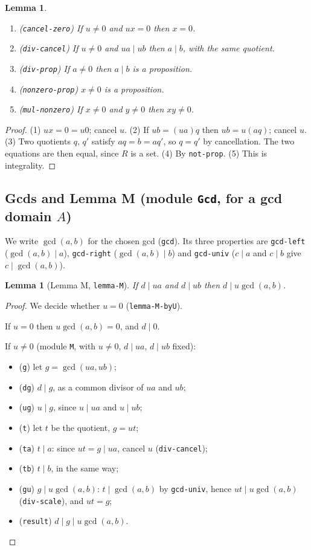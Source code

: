 \documentclass[11pt]{amsart}
\newtheorem{lemma}[theorem]{Lemma}
\theoremstyle{definition}
\theoremstyle{remark}
\newcommand{\nm}[1]{\textup{\texttt{#1}}}
\newcommand{\gcdd}{\operatorname{gcd}}
\begin{document}
\begin{lemma}
\begin{enumerate}
\item (\nm{cancel-zero}) If $u\neq0$ and $ux=0$ then $x=0$.
\item (\nm{div-cancel}) If $u\neq0$ and $ua\mid ub$ then $a\mid b$, with
  the same quotient.
\item (\nm{div-prop}) If $a\neq0$ then $a\mid b$ is a proposition.
\item (\nm{nonzero-prop}) $x\neq0$ is a proposition.
\item (\nm{mul-nonzero}) If $x\neq0$ and $y\neq0$ then $xy\neq0$.
\end{enumerate}
\end{lemma}
\begin{proof}
(1) $ux = 0 = u0$; cancel $u$.
(2) If $ub = (ua)q$ then $ub = u(aq)$; cancel $u$.
(3) Two quotients $q$, $q'$ satisfy $aq = b = aq'$, so $q=q'$ by
cancellation. The two equations are then equal, since $R$ is a set.
(4) By \nm{not-prop}. (5) This is integrality.
\end{proof}

\subsection{Gcds and Lemma M (module \nm{Gcd}, for a gcd domain $A$)}

We write $\gcdd(a,b)$ for the chosen gcd (\nm{gcd}). Its three properties
are \nm{gcd-left} ($\gcdd(a,b)\mid a$), \nm{gcd-right}
($\gcdd(a,b)\mid b$) and \nm{gcd-univ} ($c\mid a$ and $c\mid b$ give
$c\mid\gcdd(a,b)$).

\begin{lemma}[Lemma M, \nm{lemma-M}]\label{lem:M}
If $d\mid ua$ and $d\mid ub$ then $d\mid u\gcdd(a,b)$.
\end{lemma}
\begin{proof}
We decide whether $u=0$ (\nm{lemma-M-byU}).

If $u = 0$ then $u\gcdd(a,b) = 0$, and $d\mid 0$.

If $u\neq0$ (module \nm{M}, with $u\neq0$, $d\mid ua$, $d\mid ub$ fixed):
\begin{itemize}
\item (\nm{g}) let $g = \gcdd(ua,ub)$;
\item (\nm{dg}) $d\mid g$, as a common divisor of $ua$ and $ub$;
\item (\nm{ug}) $u\mid g$, since $u\mid ua$ and $u\mid ub$;
\item (\nm{t}) let $t$ be the quotient, $g = ut$;
\item (\nm{ta}) $t\mid a$: since $ut = g\mid ua$, cancel $u$
  (\nm{div-cancel});
\item (\nm{tb}) $t\mid b$, in the same way;
\item (\nm{gu}) $g\mid u\gcdd(a,b)$: $t\mid\gcdd(a,b)$ by \nm{gcd-univ},
  hence $ut\mid u\gcdd(a,b)$ (\nm{div-scale}), and $ut = g$;
\item (\nm{result}) $d\mid g\mid u\gcdd(a,b)$.\qedhere
\end{itemize}
\end{proof}
\end{document}
